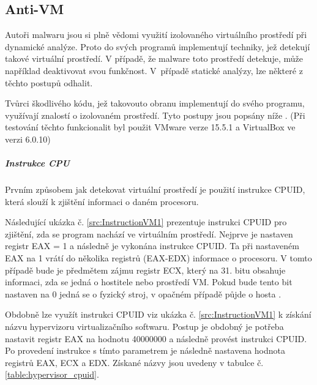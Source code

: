 \subsection{Anti-VM}
Autoři malwaru jsou si plně vědomi využití izolovaného virtuálního prostředí při dynamické analýze. Proto do svých programů implementují techniky, jež detekují takové virtuální prostředí. V případě, že malware toto prostředí detekuje, může například deaktivovat svou funkčnost. V~případě statické analýzy, lze některé z těchto postupů odhalit.

Tvůrci škodlivého kódu, jež takovouto obranu implementují do svého programu, využívají znalostí o izolovaném prostředí. Tyto postupy jsou popsány níže \cite{cyberbit_2016}. (Při testování těchto funkcionalit byl použit VMware verze 15.5.1 a VirtualBox ve verzi 6.0.10)

\subparagraph*{Instrukce CPU} 

Prvním způsobem jak detekovat virtuální prostředí je použití instrukce CPUID, která slouží k zjištění informaci o daném procesoru. 


Následující ukázka č. \ref{src:InstructionVM1} prezentuje instrukci CPUID pro zjištění, zda se program nachází ve virtuálním prostředí. Nejprve je nastaven registr EAX = 1 a následně je vykonána instrukce CPUID. Ta při nastaveném EAX na 1 vrátí do několika registrů (EAX-EDX) informace o procesoru. \cite{instruction_set_x86_cpuid} V tomto případě bude je předmětem zájmu registr ECX, který na 31. bitu obsahuje informaci, zda se jedná o hostitele nebo prostředí VM. Pokud bude tento bit nastaven na 0 jedná se o fyzický stroj, v opačném případě půjde o hosta \cite{cyberbit_2016}.

\noindent
\begin{minipage}[t]{1\textwidth}
    
\end{minipage}

Obdobně lze využít instrukci CPUID viz ukázka č. \ref{src:InstructionVM1} k získání názvu hypervizoru virtualizačního softwaru. Postup je obdobný je potřeba nastavit registr EAX na hodnotu 40000000 a následně provést instrukci CPUID. Po provedení instrukce s tímto parametrem je následně nastavena hodnota registrů EAX, ECX a EDX.
Získané názvy jsou uvedeny v tabulce č. \ref{table:hypervisor_cpuid}.

